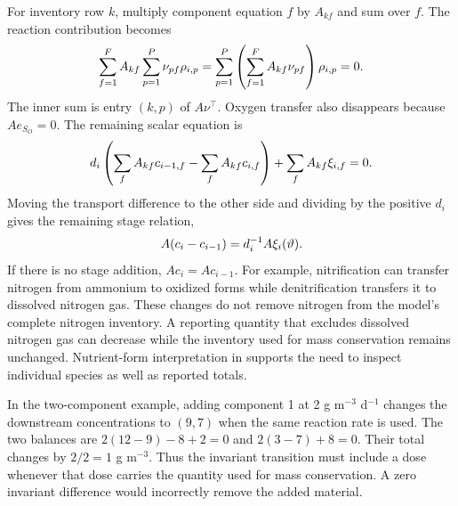 For inventory row $k$, multiply component equation $f$ by $A_{kf}$ and sum over $f$. The reaction contribution becomes
\begin{equation}
\equationname{Scalar cancellation of reaction rates in an invariant equation}
\sum_{f=1}^{F}A_{kf}\sum_{p=1}^{P}\nu_{pf}\rho_{i,p}
=\sum_{p=1}^{P}\left(\sum_{f=1}^{F}A_{kf}\nu_{pf}\right)\rho_{i,p}=0.
\end{equation}
The inner sum is entry $(k,p)$ of $A\nu^\top$. Oxygen transfer also disappears because $Ae_{S_O}=0$. The remaining scalar equation is
\begin{equation}
\equationname{Scalar reactor-stage invariant equation with external additions}
d_i\left(\sum_fA_{kf}c_{i-1,f}-\sum_fA_{kf}c_{i,f}\right)
+\sum_fA_{kf}\xi_{i,f}=0.
\end{equation}
Moving the transport difference to the other side and dividing by the positive $d_i$ gives the remaining stage relation,
\begin{equation}
\equationname{Invariant inventory change across one reactor stage}
A(c_i-c_{i-1})=d_i^{-1}A\xi_i(\vartheta).
\label{eq:plant_invariant_transition}
\end{equation}
If there is no stage addition, $Ac_i=Ac_{i-1}$. For example, nitrification can transfer nitrogen from ammonium to oxidized forms while denitrification transfers it to dissolved nitrogen gas. These changes do not remove nitrogen from the model's complete nitrogen inventory. A reporting quantity that excludes dissolved nitrogen gas can decrease while the inventory used for mass conservation remains unchanged. Nutrient-form interpretation in \citet{USEPA2009} supports the need to inspect individual species as well as reported totals.

In the two-component example, adding component 1 at 2 g m$^{-3}$ d$^{-1}$ changes the downstream concentrations to $(9,7)$ when the same reaction rate is used. The two balances are $2(12-9)-8+2=0$ and $2(3-7)+8=0$. Their total changes by $2/2=1$ g m$^{-3}$. Thus the invariant transition must include a dose whenever that dose carries the quantity used for mass conservation. A zero invariant difference would incorrectly remove the added material.

